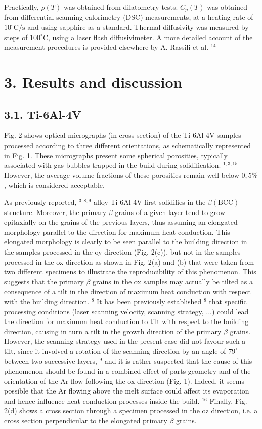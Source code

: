 \documentclass[10pt]{article}
\begin{document}
Practically, $\rho(T)$ was obtained from dilatometry tests. $C_{p}(T)$ was obtained from differential scanning calorimetry (DSC) measurements, at a heating rate of $10^{\circ} \mathrm{C} / \mathrm{s}$ and using sapphire as a standard. Thermal diffusivity was measured by steps of $100^{\circ} \mathrm{C}$, using a laser flash diffusivimeter. A more detailed account of the measurement procedures is provided elsewhere by A. Rassili et al. ${ }^{14}$

\section*{3. Results and discussion}
\subsection*{3.1. Ti-6Al-4V}
Fig. 2 shows optical micrographs (in cross section) of the Ti-6Al-4V samples processed according to three different orientations, as schematically represented in Fig. 1. These micrographs present some spherical porosities, typically associated with gas bubbles trapped in the build during solidification. ${ }^{1,3,15}$ However, the average volume fractions of these porosities remain well below $0,5 \%$, which is considered acceptable.

As previously reported, ${ }^{3,8,9}$ alloy Ti-6Al-4V first solidifies in the $\beta(\mathrm{BCC})$ structure. Moreover, the primary $\beta$ grains of a given layer tend to grow epitaxially on the grains of the previous layers, thus assuming an elongated morphology parallel to the direction for maximum heat conduction. This elongated morphology is clearly to be seen parallel to the building direction in the samples processed in the oy direction (Fig. 2(c)), but not in the samples processed in the ox direction as shown in Fig. 2(a) and (b) that were taken from two different specimens to illustrate the reproducibility of this phenomenon. This suggests that the primary $\beta$ grains in the ox samples may actually be tilted as a consequence of a tilt in the direction of maximum heat conduction with respect with the building direction. ${ }^{8}$ It has been previously established ${ }^{8}$ that specific processing conditions (laser scanning velocity, scanning strategy, ...) could lead the direction for maximum heat conduction to tilt with respect to the building direction, causing in turn a tilt in the growth direction of the primary $\beta$ grains. However, the scanning strategy used in the present case did not favour such a tilt, since it involved a rotation of the scanning direction by an angle of $79^{\circ}$ between two successive layers, ${ }^{9}$ and it is rather suspected that the cause of this phenomenon should be found in a combined effect of parts geometry and of the orientation of the Ar flow following the ox direction (Fig. 1). Indeed, it seems possible that the Ar flowing above the melt surface could affect its evaporation and hence influence heat conduction processes inside the build. ${ }^{16}$ Finally, Fig. 2(d) shows a cross section through a specimen processed in the oz direction, i.e. a cross section perpendicular to the elongated primary $\beta$ grains.
\end{document}
